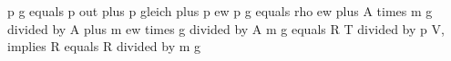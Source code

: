 p g equals p out plus p gleich plus p ew  
p g equals rho ew plus A times m g divided by A plus m ew times g divided by A  
m g equals R T divided by p V, implies R equals R divided by m g